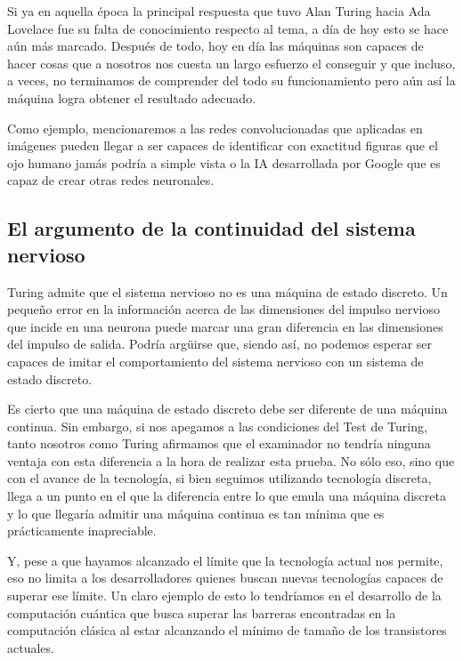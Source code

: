 \documentclass[12pt,a4paper]{article}
\begin{document}
Si ya en aquella época la principal respuesta que tuvo Alan Turing hacia Ada Lovelace fue su falta de conocimiento respecto al tema, a día de hoy esto se hace aún más marcado. Después de todo, hoy en día las máquinas son capaces de hacer cosas que a nosotros nos cuesta un largo esfuerzo el conseguir y que incluso, a veces, no terminamos de comprender del todo su funcionamiento pero aún así la máquina logra obtener el resultado adecuado.

Como ejemplo, mencionaremos a las redes convolucionadas que aplicadas en imágenes pueden llegar a ser capaces de identificar con exactitud figuras que el ojo humano jamás podría a simple vista o la IA desarrollada por Google que es capaz de crear otras redes neuronales\cite{Google}.

\subsection{El argumento de la continuidad del sistema nervioso}
Turing admite que el sistema nervioso no es una máquina de estado discreto. Un pequeño error en la información acerca de las dimensiones del impulso nervioso que incide en una neurona puede marcar una gran diferencia en las dimensiones del impulso de salida. Podría argüirse que, siendo así, no podemos esperar ser capaces de imitar el comportamiento del sistema nervioso con un sistema de estado discreto.

Es cierto que una máquina de estado discreto debe ser diferente de una máquina continua. Sin embargo, si nos apegamos a las condiciones del Test de Turing, tanto nosotros como Turing afirmamos que el examinador no tendría ninguna ventaja con esta diferencia a la hora de realizar esta prueba. No sólo eso, sino que con el avance de la tecnología, si bien seguimos utilizando tecnología discreta, llega a un punto en el que la diferencia entre lo que emula una máquina discreta y lo que llegaría admitir una máquina continua es tan mínima que es prácticamente inapreciable.

Y, pese a que hayamos alcanzado el límite que la tecnología actual nos permite, eso no limita a los desarrolladores quienes buscan nuevas tecnologías capaces de superar ese límite. Un claro ejemplo de esto lo tendríamos en el desarrollo de la computación cuántica que busca superar las barreras encontradas en la computación clásica al estar alcanzando el mínimo de tamaño de los transistores actuales.
\end{document}
